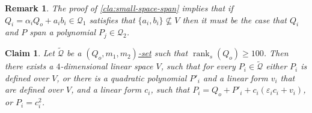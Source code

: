 \documentclass[10pt,a4paper]{article}
\newtheorem{claim}[theorem]{Claim}
\newtheorem{remark}[theorem]{Remark}
\def\rank{\operatorname{rank}}
\newcommand{\cQ}{{\mathcal{Q}}}
\def\epsilon{\varepsilon}
\newcommand{\rkq}{100}
\begin{document}
\begin{remark}\label{rem:QnotV}
The proof of  \autoref{cla:small-space-span} implies that if $Q_i=\alpha_iQ_o+a_ib_i \in \cQ_1$ satisfies that $\{a_i,b_i\}\not\subseteq V$ then
it must be the case that $Q_i$ and $P$ span a polynomial $P_j \in \cQ_2$. 
\end{remark}


\begin{claim}\label{cla:V-map-Q-dom}
Let $\tilde{\cQ}$ be a \hyperref[def:Q-dom]{$(Q_o,m_1,m_2)$-set} such that $\rank_s(Q_o)\geq \rkq$. 
Then there exists a $4$-dimensional linear space $V$, 
such that for every $P_i\in \tilde{\cQ}$ either $P_i$ is defined over $V$, or there is a quadratic polynomial $P'_i$ and a linear form $v_i$ that are defined over $V$, and  a linear form $c_i$, such that $P_i = Q_o +P'_i + c_i(\epsilon_i c_i + v_i )$, or $P_i = c_i^2$. 
\end{claim}
\end{document}
